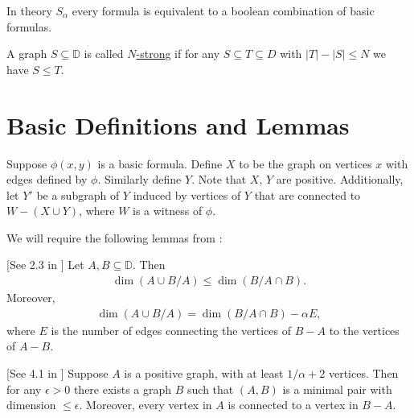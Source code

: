 \documentclass{amsart}
\newcommand{\defn}{\underline}
\newcommand{\DB}{\mathbb D}
\newcommand{\B}{B}
\newcommand{\X}{X}
\newcommand{\Y}{Y}
\begin{document}
\begin{Theorem} 
  In theory $S_\alpha$ every formula is equivalent to a boolean combination of basic formulas.
\end{Theorem}

\begin{Definition}
  A graph $S \subseteq \DB$ is called \defn{$N$-strong} if for any $S \subseteq T \subseteq D$ with $|T| - |S| \leq N$ we have $S \leq T$.
\end{Definition}

\section{Basic Definitions and Lemmas}

\begin{Definition} \label{def_basic}
  Suppose $\phi(x, y)$ is a basic formula.
  Define $\X$ to be the graph on vertices $x$ with edges defined by $\phi$.
  Similarly define $\Y$.
  Note that $\X$, $\Y$ are positive.
  Additionally, let $\Y'$ be a subgraph of $\Y$ induced by vertices of $\Y$ that are connected to $W - (X \cup Y)$, where $W$ is a witness of $\phi$.
\end{Definition}

We will require the following lemmas from \cite{laskowski}:

\begin{Lemma} \label{diamond} [See 2.3 in \cite{laskowski}]
  Let $A, B \subseteq \DB$.
  Then
  \begin{align*}
    \dim(A \cup B / A) \leq \dim(\B / A \cap B).
  \end{align*}
  Moreover, 
  \begin{align*}
    \dim(A \cup B / A) = \dim(\B / A \cap B) - \alpha E,
  \end{align*}
  where $E$ is the number of edges connecting the vertices of $B - A$ to the vertices of $A - B$.
\end{Lemma}

\begin{Lemma} \label{las_min} [See 4.1 in \cite{laskowski}]
  Suppose $A$ is a positive graph, with at least $1/\alpha + 2$ vertices.
  Then for any $\epsilon > 0$ there exists a graph $B$ such that $(A, B)$ is a minimal pair with dimension $\leq \epsilon$.
  Moreover, every vertex in $A$ is connected to a vertex in $B - A$.
\end{Lemma}
\end{document}
